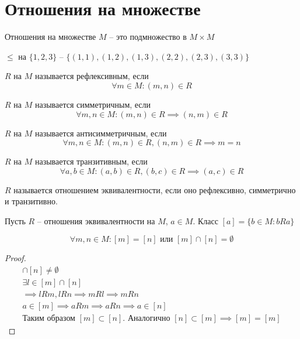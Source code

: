 \documentclass[main]{subfiles}
\begin{document}
\chapter{Отношения на множестве}
\begin{definition}
    Отношения на множестве $M$ -- это подмножество в $M\times M$
\end{definition}
\begin{example}
    $\le$ на $\{1,2,3\}$  -- $\{(1,1), (1,2), (1,3), (2,2),(2,3),(3,3)\}$
\end{example}

\begin{definition}
    $R$ на $M$ называется рефлексивным, если \[\forall m \in M: (m,n) \in R\]
\end{definition}
\begin{definition}
    $R$ на $M$ называется симметричным, если
    \[\forall m,n \in M: (m,n) \in R \implies (n,m) \in R\]
\end{definition}
\begin{definition}
    $R$ на $M$ называется антисимметричным, если
    \[\forall m,n \in M:  (m,n)\in R, (n,m) \in R \implies m = n\]
\end{definition}
\begin{definition}
    $R$ на $M$ называется транзитивным, если
    \[\forall a,b \in M: (a,b) \in R, (b,c) \in R \implies (a,c) \in R\]
\end{definition}

\begin{definition}
    $R$ называется отношением эквивалентности, если оно рефлексивно,
    симметрично и транзитивно.
\end{definition}

Пусть $R$ -- отношения эквивалентности на $M$, $a \in M$.
Класс $[a] = \{b\in M: bRa\}$

\begin{lemma}
    \[\forall m,n \in M: [m] = [n] \text{ или } [m]\cap[n] = \emptyset\]
\end{lemma}
\begin{proof}
    \begin{gather*}
        [m] \cap [n] \neq \emptyset\\
        \exists l \in [m] \cap [n]\\
        \implies lRm, lRn \implies mRl \implies mRn\\
        a\in [m] \implies aRm \implies aRn \implies a \in [n]\\
        \text{Таким образом } [m]\subset [n]. \text{ Аналогично } [n]\subset[m]
        \implies [m]=[m]
    \end{gather*}
\end{proof}
\end{document}
